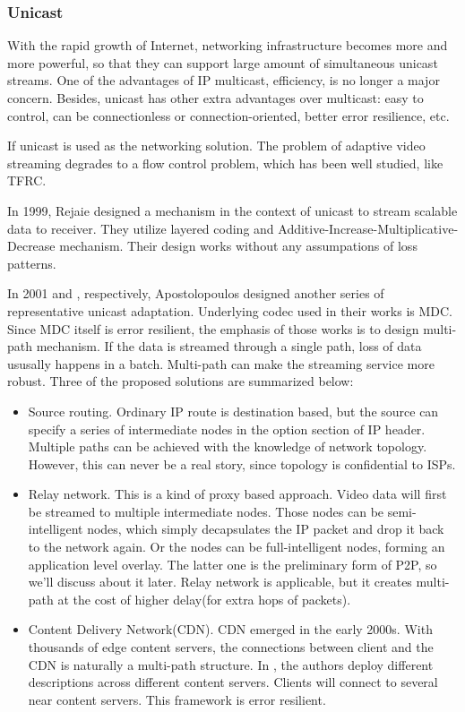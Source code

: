 \documentclass[11pt,a4paper]{article}
\begin{document}
\subsubsection{Unicast}

With the rapid growth of Internet, networking infrastructure becomes more and more 
powerful, so that they can support large amount of simultaneous unicast streams. 
One of the advantages of IP multicast, efficiency, is no longer a major concern. 
Besides, unicast has other extra advantages over multicast: easy to control, 
can be connectionless or connection-oriented, better error resilience, etc.

If unicast is used as the networking solution. The problem of adaptive 
video streaming degrades to a flow control problem, which has been 
well studied, like TFRC\cite{floyd2000equation}. 

In 1999, Rejaie designed a mechanism in the context of unicast
to stream scalable data to receiver\cite{rejaie1999quality}. 
They utilize layered coding and Additive-Increase-Multiplicative-Decrease 
mechanism. Their design works without any assumpations of loss patterns. 

In 2001\cite{apostolopoulos2001reliable} and \cite{apostolopoulos2002multiple}, 
respectively, Apostolopoulos designed another series of representative 
unicast adaptation. Underlying codec used in their works is MDC. 
Since MDC itself is error resilient, the emphasis of those works is to 
design multi-path mechanism. If the data is streamed through a single path, 
loss of data ususally happens in a batch. Multi-path can make the streaming 
service more robust. Three of the proposed solutions are summarized below:
\begin{itemize}
	\item Source routing\cite{apostolopoulos2001reliable}. 
	Ordinary IP route is destination based, but the source can specify 
	a series of intermediate nodes in the option section of IP header.
	Multiple paths can be achieved with the knowledge of network topology. 
	However, this can never be a real story, since topology is confidential
	to ISPs.  
	\item Relay network\cite{apostolopoulos2001reliable}. 
	This is a kind of proxy based approach. Video data will first be streamed
	to multiple intermediate nodes. Those nodes can be semi-intelligent nodes, 
	which simply decapsulates the IP packet and drop it back to the network again. 
	Or the nodes can be full-intelligent nodes, forming an application level 
	overlay. The latter one is the preliminary form of P2P, so we'll discuss about
	it later. Relay network is applicable, but it creates multi-path at the cost
	of higher delay(for extra hops of packets). 
	\item Content Delivery Network(CDN)\cite{apostolopoulos2002multiple}. 
	CDN emerged in the early 2000s. With thousands of edge content servers, 
	the connections between client and the CDN is naturally a multi-path 
	structure. In \cite{apostolopoulos2002multiple}, the authors deploy 
	different descriptions across different content servers. Clients 
	will connect to several near content servers. This framework is error
	resilient. 
\end{itemize}
\end{document}
